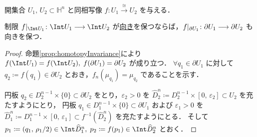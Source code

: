\documentclass[algtopo_main]{subfiles}
\begin{document}
\begin{mylem}[label=lem:induced-orientation-2]{}
    開集合 $U_1,\, U_2 \subset \mathbb{H}^n$ と同相写像 $f \colon U_1 \xrightarrow{\cong} U_2$ を与える．

    制限 $f|_{\Int U_1} \colon \Int U_1 \lto \Int U_2$ が\hyperref[def:loc-degree]{向き}を保つならば，$f|_{\partial U_1} \colon \partial U_1 \longrightarrow \partial U_2$ も向きを保つ．
\end{mylem}

\begin{proof}
    命題\ref{prop:homotopyInvariance}により $f(\Int U_1) = f(\Int U_2),\; f(\partial U_1) = \partial U_2$ が成り立つ．
    $\forall q_1 \in \partial U_1$ に対して $q_2 \coloneqq f(q_1) \in \partial U_2$ とおき，$f_n (\mu_{q_1}) = \mu_{q_2}$ であることを示す．

    円板 $q_2 \in D_2^{n-1} \times \{0\} \subset \partial U_2$ をとり，$\varepsilon_2 > 0$ を $\widehat{D}_2^{n} \coloneqq D_2^{n-1} \times [0,\, \varepsilon_2] \subset U_2$ を充たすようにとり，
    円板 $q_1 \in D_1^{n-1} \times \{0\} \subset \partial U_1$ および $\varepsilon_1 > 0$ を $\widehat{D}_1^{n} \coloneqq D_1^{n-1} \times [0,\, \varepsilon_1] \subset f^{-1}(\widehat{D}_2^n)$ を充たすようにとる．
    そして $p_1 \coloneqq (q_1,\, \rho_1 / 2) \in \Int \widehat{D}_1^n,\; p_2 \coloneqq f(p_1) \in \Int \widehat{D}_2^n$ とおく．


\end{proof}
\end{document}
